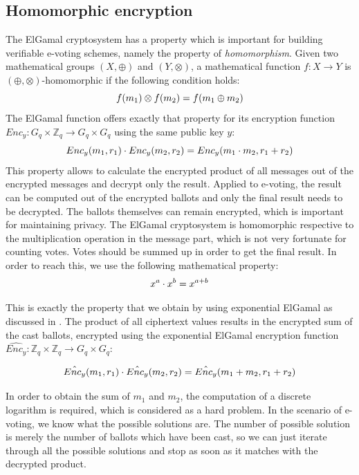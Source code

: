 \documentclass[numbers=noenddot, abstract=on, a4paper, headsepline,
footsepline, oneside, draft=off]{scrreprt}
\begin{document}
\subsection{Homomorphic encryption}
\label{sec:homenc}
The ElGamal cryptosystem has a property
which is important for building verifiable e-voting schemes, namely the property
of \emph{homomorphism}. Given two mathematical groups $(X,\oplus)$ and
$(Y,\otimes)$, a mathematical function $f:X \rightarrow Y$ is $(\oplus, \otimes)$-homomorphic if
the following condition holds:
\begin{equation}
f(m_1) \otimes f(m_2) = f(m_1 \oplus m_2) \notag
\end{equation}
The ElGamal function offers exactly that property for its encryption function
$Enc_y:G_q \times \mathbb{Z}_q \rightarrow G_q \times G_q$ using the same public key $y$:
\begin{equation}
Enc_y(m_1, r_1) \cdot Enc_y(m_2, r_2) = Enc_y(m_1 \cdot m_2, r_1 + r_2)
\notag
\end{equation}
This property allows to calculate the encrypted product of all messages out of
the encrypted messages and decrypt only the result. Applied to e-voting, the
result can be computed out of the encrypted ballots and only the final result
needs to be decrypted. The ballots themselves can remain encrypted, which is
important for maintaining privacy. The ElGamal cryptosystem is homomorphic
respective to the multiplication operation in the message part, which is not
very fortunate for counting votes. Votes should be summed up in order to get the
final result. In order to reach this, we use the following mathematical property:
\begin{equation}
x^a \cdot x^b = x^{a+b} \notag
\end{equation}

This is exactly the property that we obtain by using exponential ElGamal as
discussed in . The product of all ciphertext
values results in the encrypted sum of the cast ballots, encrypted using the
exponential ElGamal encryption function $\hat{Enc_y}:\mathbb{Z}_q \times
\mathbb{Z}_q \rightarrow G_q \times G_q$:

\begin{equation}
\hat{Enc_y}(m_1, r_1) \cdot \hat{Enc_y}(m_2, r_2) = \hat{Enc_y}(m_1 + m_2, r_1 +
r_2)
\notag
\end{equation}

In order to obtain the sum of $m_1$ and $m_2$, the computation of a discrete
logarithm is required, which is considered as a hard problem. In the scenario of
e-voting, we know what the possible solutions are. The number of possible
solution is merely the number of ballots which have been cast, so we can just
iterate through all the possible solutions and stop as soon as it matches with
the decrypted product.
\end{document}
